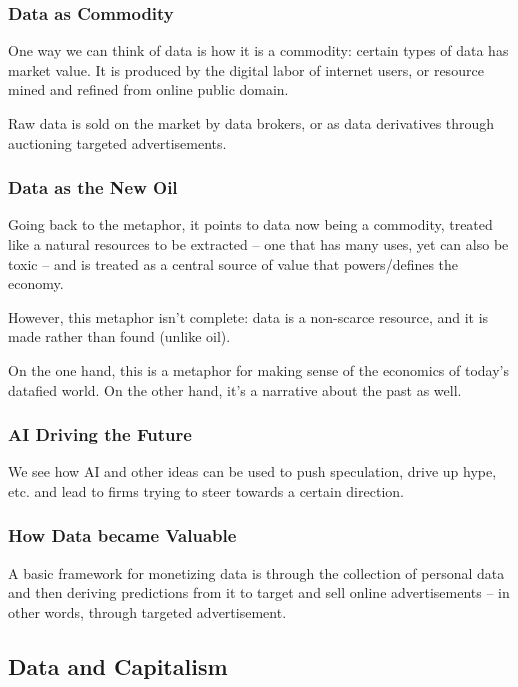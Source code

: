 \documentclass[openany]{book}
\begin{document}
\subsubsection{Data as Commodity}
One way we can think of data is how it is a commodity: certain types of data has market value. It is produced by the digital labor of internet users, or resource mined and refined from online public domain.

Raw data is sold on the market by data brokers, or as data derivatives through auctioning targeted advertisements.

\subsubsection{Data as the New Oil}
Going back to the metaphor, it points to data now being a commodity, treated like a natural resources to be extracted -- one that has many uses, yet can also be toxic -- and is treated as a central source of value that powers/defines the economy.

However, this metaphor isn't complete: data is a non-scarce resource, and it is made rather than found (unlike oil).

On the one hand, this is a metaphor for making sense of the economics of today's datafied world. On the other hand, it's a narrative about the past as well.

\subsubsection{AI Driving the Future}
We see how AI and other ideas can be used to push speculation, drive up hype, etc. and lead to firms trying to steer towards a certain direction.

\subsubsection{How Data became Valuable}
A basic framework for monetizing data is through the collection of personal data and then deriving predictions from it to target and sell online advertisements -- in other words, through targeted advertisement.

\subsection{Data and Capitalism}
\end{document}
